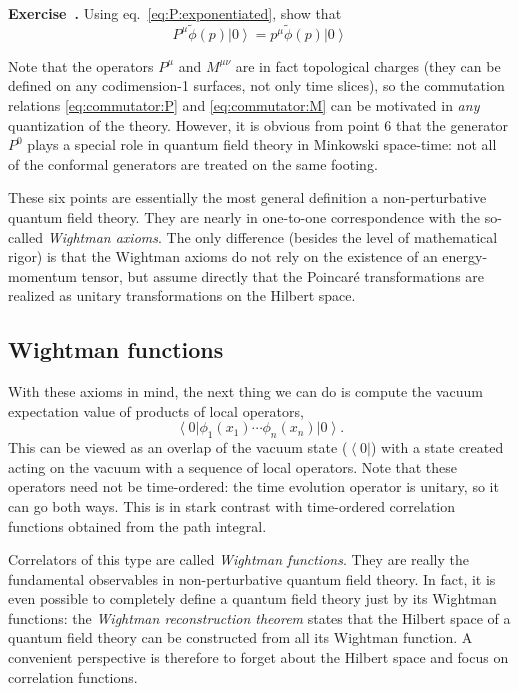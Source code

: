 \documentclass[a4paper,12pt]{article}
\newcommand{\ket}[1]{\left| #1 \right\rangle}
\newcommand{\bra}[1]{\left\langle #1 \right|}
\numberwithin{equation}{section}
\newcounter{exercise}[section]
\newenvironment{exercise}[1][]%
	{\refstepcounter{exercise}\bigskip
	\begin{mdframed}[backgroundcolor=gray!20, linewidth=0]
	\noindent\textbf{Exercise~\thesection.\theexercise #1} \rmfamily}
  	{\end{mdframed}\bigskip}
\begin{document}
%
\begin{exercise}
	Using eq.~\eqref{eq:P:exponentiated}, show that 
	$$ 
		P^\mu \widetilde{\phi}(p) \ket{0}
		= p^\mu \widetilde{\phi}(p) \ket{0} 
	$$
\end{exercise}
%
Note that the operators $P^\mu$ and $M^{\mu\nu}$ are in fact topological charges (they can be defined on any codimension-1 surfaces, not only time slices), so the commutation relations \eqref{eq:commutator:P} and \eqref{eq:commutator:M} can be motivated in \emph{any} quantization of the theory.
However, it is obvious from point 6 that the generator $P^0$ plays a special role in quantum field theory in Minkowski space-time: not all of the conformal generators are treated on the same footing.

These six points are essentially the most general definition a non-perturbative quantum field theory. They are nearly in one-to-one correspondence with the so-called \emph{Wightman axioms}. The only difference (besides the level of mathematical rigor) is that the Wightman axioms do not rely on the existence of an energy-momentum tensor, but assume directly that the Poincaré transformations are realized as unitary transformations on the Hilbert space.

\subsection{Wightman functions}

With these axioms in mind, the next thing we can do is compute the vacuum expectation value of products of local operators,
\begin{equation}
	\bra{0} \phi_1(x_1) \cdots \phi_n(x_n) \ket{0}.
\end{equation}
This can be viewed as an overlap of the vacuum state ($\bra{0}$) with a  state created acting on the vacuum with a sequence of local operators. Note that these operators need not be time-ordered: the time evolution operator is unitary, so it can go both ways. This is in stark contrast with time-ordered correlation functions obtained from the path integral.

Correlators of this type are called \emph{Wightman functions}. They are really the fundamental observables in non-perturbative quantum field theory. In fact, it is even possible to completely define a quantum field theory just by its Wightman functions: the \emph{Wightman reconstruction theorem} states that the Hilbert space of a quantum field theory can be constructed from all its Wightman function.
A convenient perspective is therefore to forget about the Hilbert space and focus on correlation functions.
\end{document}
